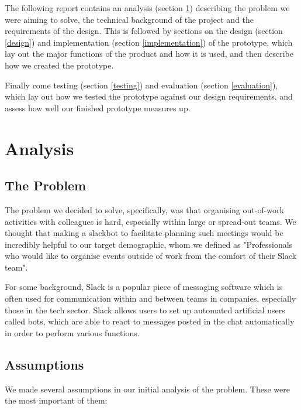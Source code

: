 \documentclass[12pt]{report}
\begin{document}
\vspace{3mm}

The following report contains an analysis (section \ref{analysis}) describing the problem we were aiming to solve, the technical background of the project and the requirements of the design. This is followed by sections on the design (section \ref{design}) and implementation (section \ref{implementation}) of the prototype, which lay out the major functions of the product and how it is used, and then describe how we created the prototype.

\vspace{3mm}

Finally come testing (section \ref{testing}) and evaluation (section \ref{evaluation}), which lay out how we tested the prototype against our design requirements, and assess how well our finished prototype measures up.

\chapter{Analysis}\label{analysis}
\section{The Problem}
The problem we decided to solve, specifically, was that organising out-of-work activities with colleagues is hard, especially within large or spread-out teams. We thought that making a slackbot to facilitate planning such meetings would be incredibly helpful to our target demographic, whom we defined as "Professionals who would like to organise events outside of work from the comfort of their Slack team".

\vspace{3mm}

For some background, Slack is a popular piece of messaging software which is often used for communication within and between teams in companies, especially those in the tech sector. Slack allows users to set up automated artificial users called bots, which are able to react to messages posted in the chat automatically in order to perform various functions.

\section{Assumptions}\label{assumptions}
We made several assumptions in our initial analysis of the problem. These were the most important of them:
\end{document}
